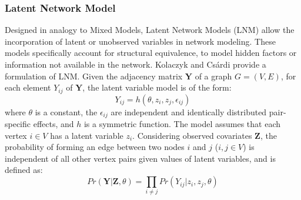 \pagebreak
\subsubsection{Latent Network Model}
\label{sec:back_lnm}
Designed in analogy to Mixed Models, Latent Network Models (LNM) allow the incorporation of latent or unobserved variables in network modeling. These models specifically account for structural equivalence, to model hidden factors or information not available in the network. Kolaczyk and Cs\'ardi \cite{kolaczyk_statistical_2014} provide a formulation of LNM. Given the adjacency matrix $\mathbf{Y}$ of a graph $G=(V,E)$, for each element $Y_{ij}$ of $\mathbf{Y}$, the latent variable model is of the form:
\begin{equation}Y_{ij}=h(\theta,z_i,z_j,\epsilon_{ij})\end{equation} where $\theta$ is a constant, the $\epsilon_{ij}$ are independent and identically distributed pair-specific effects, and $h$ is a symmetric function. The model assumes that each vertex $i\in V$ has a latent variable $z_i$. Considering observed covariates $\mathbf{Z}$, the probability of forming an edge between two nodes $i$ and $j$ ($i,j \in V$) is independent of all other vertex pairs given values of latent variables, and is defined as:
\begin{equation}
Pr(\mathbf{Y}|\mathbf{Z},\theta)=\prod_{i\neq j}Pr\left(Y_{ij}|z_i,z_j,\theta \right)
\end{equation}
